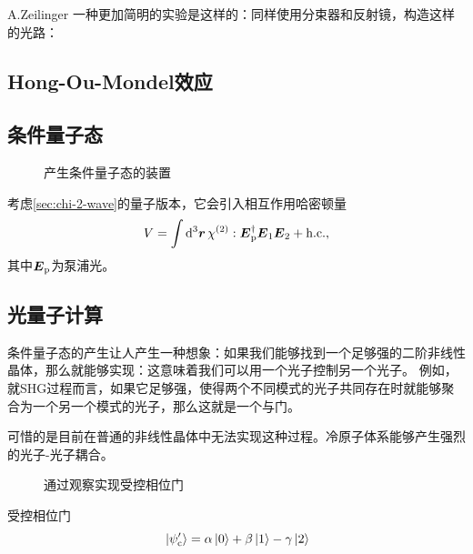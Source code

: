 A.Zeilinger
一种更加简明的实验是这样的：同样使用分束器和反射镜，构造这样的光路：

\subsection{Hong-Ou-Mondel效应}



\subsection{条件量子态}

\begin{figure}
    \centering
    
    \caption{产生条件量子态的装置}
\end{figure}

考虑\autoref{sec:chi-2-wave}的量子版本，它会引入相互作用哈密顿量
\begin{equation}
    V = \int \dd[3]{\vb*{r}} \chi^{(2)} : \vb*{E}_\text{p}^\dagger \vb*{E}_1 \vb*{E}_2 + \text{h.c.},
\end{equation}
其中$\vb*{E}_\text{p}$为泵浦光。

\subsection{光量子计算}

条件量子态的产生让人产生一种想象：如果我们能够找到一个足够强的二阶非线性晶体，那么就能够实现：这意味着我们可以用一个光子控制另一个光子。
例如，就SHG过程而言，如果它足够强，使得两个不同模式的光子共同存在时就能够聚合为一个另一个模式的光子，那么这就是一个与门。

可惜的是目前在普通的非线性晶体中无法实现这种过程。冷原子体系能够产生强烈的光子-光子耦合。

\begin{figure}
    \centering
    
    \caption{通过观察实现受控相位门}
\end{figure}

受控相位门
\begin{equation}
    \ket*{\psi_\text{c}'} = \alpha \ket*{0} + \beta \ket*{1} - \gamma \ket*{2}
\end{equation}
